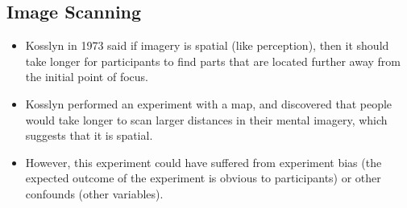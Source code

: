 \documentclass[]{article}
\begin{document}
		\subsection{Image Scanning}
			\begin{itemize}
				\item Kosslyn in 1973 said if imagery is spatial (like perception), then it should take longer for participants to find parts that are located further away from the initial point of focus. 
				\item Kosslyn performed an experiment with a map, and discovered that people would take longer to scan larger distances in their mental imagery, which suggests that it is spatial.
				\item However, this experiment could have suffered from experiment bias (the expected outcome of the experiment is obvious to participants) or other confounds (other variables).
			\end{itemize}
\end{document}
